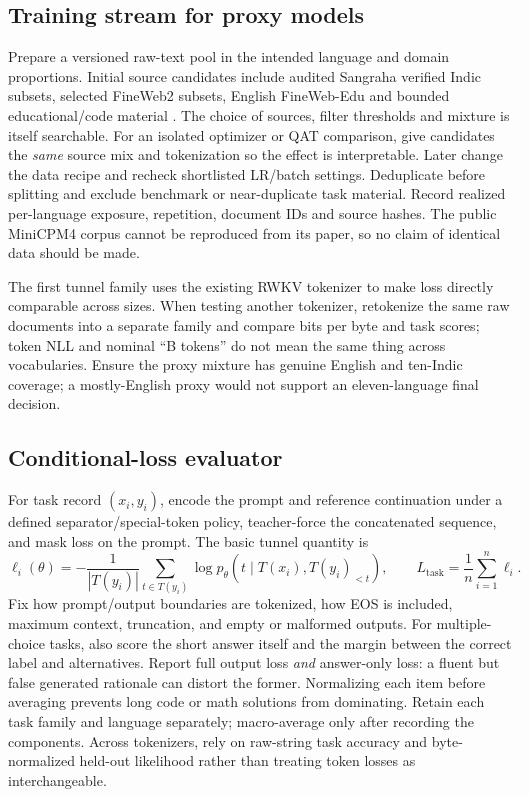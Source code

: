 \documentclass[10pt,a4paper]{article}
\begin{document}
\subsection{Training stream for proxy models}

Prepare a versioned raw-text pool in the intended language and domain proportions. Initial source candidates include audited Sangraha verified Indic subsets, selected FineWeb2 subsets, English FineWeb-Edu and bounded educational/code material \cite{sangraha,fineweb2}. The choice of sources, filter thresholds and mixture is itself searchable. For an isolated optimizer or QAT comparison, give candidates the \emph{same} source mix and tokenization so the effect is interpretable. Later change the data recipe and recheck shortlisted LR/batch settings. Deduplicate before splitting and exclude benchmark or near-duplicate task material. Record realized per-language exposure, repetition, document IDs and source hashes. The public MiniCPM4 corpus cannot be reproduced from its paper, so no claim of identical data should be made.

The first tunnel family uses the existing RWKV tokenizer to make loss directly comparable across sizes. When testing another tokenizer, retokenize the same raw documents into a separate family and compare bits per byte and task scores; token NLL and nominal ``B tokens'' do not mean the same thing across vocabularies. Ensure the proxy mixture has genuine English and ten-Indic coverage; a mostly-English proxy would not support an eleven-language final decision.

\subsection{Conditional-loss evaluator}

For task record $(x_i,y_i)$, encode the prompt and reference continuation under a defined separator/special-token policy, teacher-force the concatenated sequence, and mask loss on the prompt. The basic tunnel quantity is
\begin{equation}
\ell_i(\theta)=-\frac{1}{|T(y_i)|}\sum_{t\in T(y_i)}\log p_\theta(t\mid T(x_i),T(y_i)_{<t}),\qquad
L_{\mathrm{task}}=\frac{1}{n}\sum_{i=1}^{n}\ell_i.
\label{eq:taskloss}
\end{equation}
Fix how prompt/output boundaries are tokenized, how EOS is included, maximum context, truncation, and empty or malformed outputs. For multiple-choice tasks, also score the short answer itself and the margin between the correct label and alternatives. Report full output loss \emph{and} answer-only loss: a fluent but false generated rationale can distort the former. Normalizing each item before averaging prevents long code or math solutions from dominating. Retain each task family and language separately; macro-average only after recording the components. Across tokenizers, rely on raw-string task accuracy and byte-normalized held-out likelihood rather than treating token losses as interchangeable.
\end{document}
